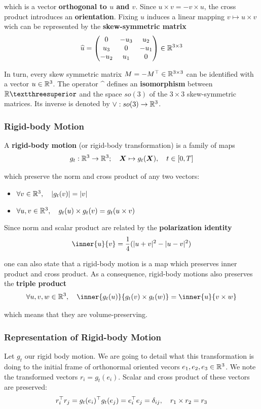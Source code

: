 which is a vector \textbf{orthogonal to $u$ and $v$}.
Since $u \times v = -v \times u$, the cross product introduces an \textbf{orientation}.
Fixing $u$ induces a linear mapping $v \mapsto u \times v$ wich
can be represented by the \textbf{skew-symmetric matrix}
\[\widehat{u} = \hatmat{u_1}{u_2}{u_3} \in \RR{3}{3}\]

In turn, every skew symmetric matrix $M = -\tr{M} \in \RR{3}{3}$
can be identified with a vector $u \in \R^3$.
The operator \^{} defines an \textbf{isomorphism} between $\R³$
and the space $so(3)$ of the $3 \times 3$ skew-symmetric matrices.
Its inverse is denoted by $\vee : so(3) \rightarrow \R^3$.


\subsubsection{Rigid-body Motion}
\label{ssub:rigid_body_motion}

A \textbf{rigid-body motion} (or rigid-body transformation)
is a family of maps
\[g_t : \R^3 \rightarrow \R^3;\quad \bm{X} \mapsto g_t(\bm{X}),\quad t \in [0,T]\]

which preserve the norm and cross product of any two vectors:
\begin{itemize}
	\setlength\itemsep{-0.2em}
	\item $\forall v \in \R^3, \quad |g_t(v)| = |v|$
	\item $\forall u,v \in \R^3, \quad g_t(u) \times g_t(v) = g_t(u \times v)$
\end{itemize}

Since norm and scalar product are related by the \textbf{polarization identity}
\[\inner{u}{v} = \frac{1}{4}(|u+v|^2 - |u-v|^2)\]

one can also state that a rigid-body motion is a map which
preserves inner product and cross product.
As a consequence, rigid-body motions also preserves the \textbf{triple product}
\[\forall u, v, w \in \R^3, \quad
	\inner{g_t(u)}{g_t(v) \times g_t(w)} = \inner{u}{v \times w}\]

which means that they are volume-preserving.


\subsubsection{Representation of Rigid-body Motion}
\label{ssub:representation_of_rigid_body_motion}

Let $g_t$ our rigid body motion. We are going to detail what this transformation
is doing to the initial frame of orthonormal oriented vecors
$e_1, e_2, e_3 \in \R^3$.
We note the transformed vectors $r_i = g_t(e_i)$.
Scalar and cross product of these vectors are preserved:
	\[\tr{r_i}r_j = \tr{g_t(e_i)}g_t(e_j) = \tr{e_i}e_j = \delta_{ij}, \quad
	r_1 \times r_2 = r_3\]

